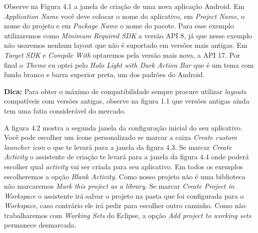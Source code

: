 \documentclass[a4paper,12pt,brazil]{book}
\begin{document}
\newpage
Observe na Figura 4.1 a janela de criação de uma nova aplicação Android. Em \emph{Application Name} você deve colocar o nome do aplicativo, em \emph{Project Name}, o nome do projeto e em \emph{Package Name} o nome do pacote. Para esse exemplo utilizaremos como \emph{Minimum Required SDK} a versão API 8, já que nesse exemplo não usaremos nenhum layout que não é suportado em versões mais antigas. Em \emph{Target SDK} e \emph{Compile With} optaremos pela versão mais nova, a API 17. Por final o \emph{Theme} eu optei pelo \emph{Holo Light with Dark Action Bar} que é um tema com fundo branco e barra superior preta, um dos padrões do Android.

\begin{framed}
\textbf{Dica:} Para obter o máximo de compatibilidade sempre procure utilizar \emph{layouts} compatíveis com versões antigas, observe na figura 1.1 que versões antigas ainda tem uma fatia considerável do mercado.
\end{framed}

A figura 4.2 mostra a segunda janela da configuração inicial do seu aplicativo. Você pode escolher um ícone personalizado se marcar a caixa \emph{Create custom launcher icon} o que te levará para a janela da figura 4.3. Se marcar \emph{Create Activity}  o assistente de criação te levará para a janela da figura 4.4 onde poderá escolher qual \emph{activity} vai ser criada para seu aplicativo. Em todos os exemplos escolheremos a opção \emph{Blank Activity}. Como nosso projeto não é uma biblioteca não marcaremos \emph{Mark this project as a library}. Se marcar \emph{Create Project in Workspace} o assistente irá salvar o projeto na pasta que foi configurada para o \emph{Workspace}, caso contrário ele irá pedir para escolher outro caminho. Como não trabalharemos com \emph{Working Sets} do Eclipse, a opção \emph{Add project to working sets} permanece desmarcada. 
\end{document}
